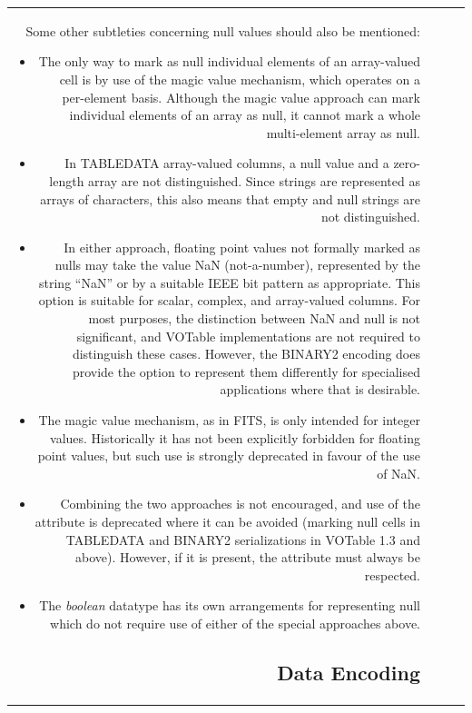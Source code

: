 \begin{tabular}{RRCp{0.8\textwidth}}
\begin{center}
{Some other subtleties concerning null values should also be mentioned:
\begin{itemize}
\item The only way to mark as null individual elements of an array-valued cell
      is by use of the magic value mechanism, which operates on a
      per-element basis.
      Although the magic value approach can mark individual elements
      of an array as null, it cannot mark a whole multi-element array as null.
\item In TABLEDATA array-valued columns, a null value and a zero-length
      array are not distinguished.
      Since strings are represented as arrays of characters, this also
      means that empty and null strings are not distinguished.
\item In either approach, floating point values not formally marked as nulls
      may take the value NaN (not-a-number),
      represented by the string ``NaN'' or by a suitable IEEE bit pattern
      as appropriate.
      This option is suitable for scalar, complex, and array-valued columns.
      For most purposes, the distinction between NaN and null is not
      significant, and VOTable implementations are not required to distinguish
      these cases.  However, the BINARY2 encoding does provide the option
      to represent them differently for specialised applications where
      that is desirable.
\item The magic value mechanism, as in FITS, is only intended for integer
      values.  Historically it has not been explicitly forbidden for
      floating point values, but such use is strongly deprecated in favour
      of the use of NaN.
\item Combining the two approaches is not encouraged,
      and use of the   attribute is deprecated
      where it can be avoided (marking null cells in TABLEDATA and BINARY2
      serializations in VOTable 1.3 and above).
      However, if it is present, the   attribute
      must always be respected.
\item The {\em boolean} datatype has its own arrangements for representing
      null which do not require use of either of the special approaches above.
\end{itemize}


\subsection{Data Encoding}
\label{elem:STREAM}

}
\end{center}
\end{tabular}
